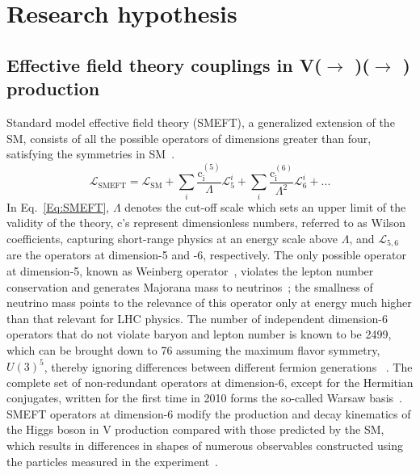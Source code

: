 \documentclass[a4paper,11pt]{article}
\newcommand{\Pb}{{{\Pqb}}\xspace}
\newcommand{\PAb}{{{{\Paqb}}}\xspace}
\renewcommand{\PV}{{{{V}}}\xspace}
\newcommand{\VH}{{{\PV}{\PH}}\xspace}
\begin{document}
\section{Research hypothesis}
\label{sec:research_hypo}

\subsection{Effective field theory couplings in \PV($\to$ \Pl\Pl)\PH($\to$ \Pb \PAb) production}

Standard model effective field theory (SMEFT), a generalized extension of the SM, consists of all the possible operators of dimensions greater than four, satisfying the symmetries in SM~\cite{Jenkins:2013zja,Alonso:2013hga,Jenkins:2013wua,Englert:2014cva,Brivio:2017vri}. 
\begin{equation}
\mathcal{L}_{\text{SMEFT}} = \mathcal{L}_{\text{SM}} +  {\sum}_{i} \frac{\text{c}_\text{i}^{\left(5\right)}}{\Lambda} \mathcal{L}_{5}^{i} + {\sum}_{i} \frac{\text{c}_\text{i}^{\left(6\right)}}{{\Lambda}^{2}} \mathcal{L}_{6}^{i} + ...
\label{Eq:SMEFT}
\end{equation}
In Eq.~\eqref{Eq:SMEFT}, $\Lambda$ denotes the cut-off scale which sets an upper limit of the validity of the theory, $\text{c}$'s represent dimensionless numbers, referred to as Wilson coefficients, capturing short-range physics at an energy scale above $\Lambda$, and $\mathcal{L}_{5,6}$ are the operators at dimension-5 and -6, respectively.
The only possible operator at dimension-5, known as Weinberg operator~\cite{PhysRevLett.43.1566}, violates the lepton number conservation and generates Majorana mass to neutrinos~\cite{Bonnet:2009ej}; 
the smallness of neutrino mass points to the relevance of this operator only at energy much higher than that relevant for LHC physics. 
The number of independent dimension-6 operators that do not violate baryon and lepton number is known to be 2499,
which can be brought down to 76 assuming the maximum flavor symmetry, $U(3)^5$, 
thereby ignoring differences between different fermion generations
~\cite{Alonso:2013hga}.
The complete set of non-redundant operators at  dimension-6, except for the Hermitian conjugates, written for the first time in 2010 forms the so-called Warsaw basis~\cite{Grzadkowski:2010es}. 
SMEFT operators at dimension-6 modify the production and decay kinematics of the Higgs boson in \VH production compared with those predicted by the SM, which results in differences in shapes of numerous observables constructed using the particles measured in the experiment~\cite{Hagiwara:1993qt,Ellis:2014dva,Murphy:2017omb,Baglio:2020oqu}. 
\end{document}
